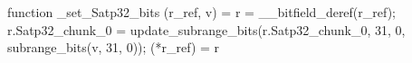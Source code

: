 function _set_Satp32_bits (r_ref, v) = {
    r = __bitfield_deref(r_ref);
    r.Satp32_chunk_0 = update_subrange_bits(r.Satp32_chunk_0, 31, 0, subrange_bits(v, 31, 0));
    (*r_ref) = r
}
